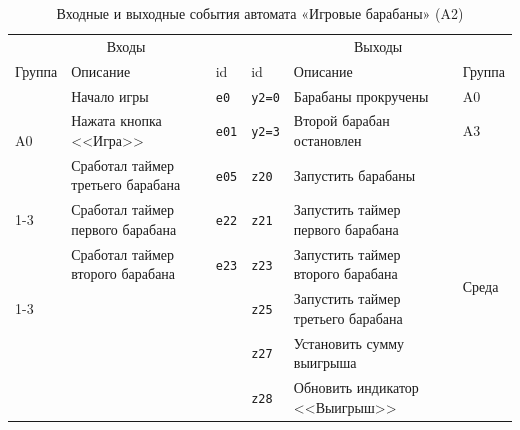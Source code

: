 \begin{table}[H]
\centering
\caption{Входные и выходные события автомата «Игровые барабаны» (A2)}
\small
\begin{tabular}{@{}p{1.3cm}p{4.6cm}l|lp{4.6cm}p{1.3cm}@{}}
\toprule
\multicolumn{3}{c}{Входы} & \multicolumn{3}{c}{Выходы} \\
Группа & Описание & id & id & Описание & Группа \\
\midrule
\multirow{3}{*}{A0} & Начало игры & \texttt{e0} & \texttt{y2=0} & Барабаны прокручены & \multirow{1}{*}{A0} \\
\cline{4-6}
 & Нажата кнопка <<Игра>> & \texttt{e01} & \texttt{y2=3} & Второй барабан остановлен & \multirow{1}{*}{A3} \\
\cline{4-6}
 & Сработал таймер третьего барабана & \texttt{e05} & \texttt{z20} & Запустить барабаны & \multirow{6}{*}{Среда} \\
\cline{1-3}
\multirow{2}{*}{Среда} & Сработал таймер первого барабана & \texttt{e22} & \texttt{z21} & Запустить таймер первого барабана &  \\
 & Сработал таймер второго барабана & \texttt{e23} & \texttt{z23} & Запустить таймер второго барабана &  \\
\cline{1-3}
 &  &  & \texttt{z25} & Запустить таймер третьего барабана &  \\
 &  &  & \texttt{z27} & Установить сумму выигрыша &  \\
 &  &  & \texttt{z28} & Обновить индикатор <<Выигрыш>> &  \\
\bottomrule
\end{tabular}
\end{table}